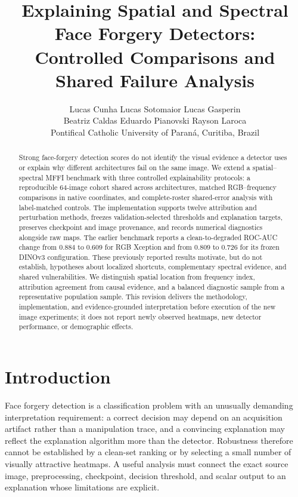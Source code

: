 \documentclass{article}
\title{Explaining Spatial and Spectral Face Forgery Detectors:\\Controlled Comparisons and Shared Failure Analysis}
\author{Lucas Cunha \quad Lucas Sotomaior \quad Lucas Gasperin\\Beatriz Caldas \quad Eduardo Pianovski \quad Rayson Laroca\\Pontifical Catholic University of Paran\'{a}, Curitiba, Brazil}
\begin{document}
\maketitle
{}

\begin{abstract}
Strong face-forgery detection scores do not identify the visual evidence a detector uses or explain why different architectures fail on the same image. We extend a spatial--spectral MFFI benchmark with three controlled explainability protocols: a reproducible 64-image cohort shared across architectures, matched RGB--frequency comparisons in native coordinates, and complete-roster shared-error analysis with label-matched controls. The implementation supports twelve attribution and perturbation methods, freezes validation-selected thresholds and explanation targets, preserves checkpoint and image provenance, and records numerical diagnostics alongside raw maps. The earlier benchmark reports a clean-to-degraded ROC-AUC change from 0.884 to 0.609 for RGB Xception and from 0.809 to 0.726 for its frozen DINOv3 configuration. These previously reported results motivate, but do not establish, hypotheses about localized shortcuts, complementary spectral evidence, and shared vulnerabilities. We distinguish spatial location from frequency index, attribution agreement from causal evidence, and a balanced diagnostic sample from a representative population sample. This revision delivers the methodology, implementation, and evidence-grounded interpretation before execution of the new image experiments; it does not report newly observed heatmaps, new detector performance, or demographic effects.
\end{abstract}

\section{Introduction}
Face forgery detection is a classification problem with an unusually demanding interpretation requirement: a correct decision may depend on an acquisition artifact rather than a manipulation trace, and a convincing explanation may reflect the explanation algorithm more than the detector. Robustness therefore cannot be established by a clean-set ranking or by selecting a small number of visually attractive heatmaps. A useful analysis must connect the exact source image, preprocessing, checkpoint, decision threshold, and scalar output to an explanation whose limitations are explicit.
\end{document}
